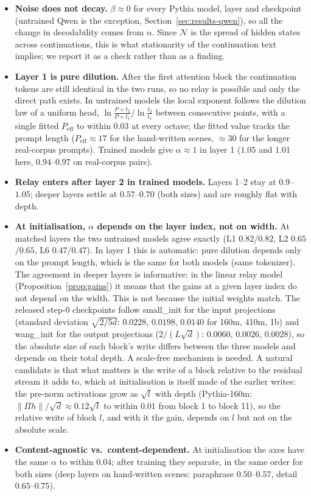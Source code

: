 \documentclass[11pt]{article}
\theoremstyle{definition}
\theoremstyle{remark}
\begin{document}
\begin{itemize}
  \item \textbf{Noise does not decay.} $\beta\approx 0$ for every Pythia model, layer and checkpoint (untrained Qwen is the exception, Section~\ref{sec:results-qwen}), so all the change in decodability comes from $\alpha$. Since $\mathcal N$ is the spread of hidden states across continuations, this is what stationarity of the continuation text implies; we report it as a check rather than as a finding.
  \item \textbf{Layer 1 is pure dilution.} After the first attention block the continuation tokens are still identical in the two runs, so no relay is possible and only the direct path exists. In untrained models the local exponent follows the dilution law of a uniform head, $\ln\frac{P+t_2}{P+t_1}\big/\ln\frac{t_2}{t_1}$ between consecutive points, with a single fitted $P_{\mathrm{eff}}$ to within $0.03$ at every octave; the fitted value tracks the prompt length ($P_{\mathrm{eff}}\approx17$ for the hand-written scenes, $\approx30$ for the longer real-corpus prompts). Trained models give $\alpha\approx1$ in layer 1 ($1.05$ and $1.01$ here, $0.94$--$0.97$ on real-corpus pairs).
  \item \textbf{Relay enters after layer 2 in trained models.} Layers 1--2 stay at $0.9$--$1.05$; deeper layers settle at $0.57$--$0.70$ (both sizes) and are roughly flat with depth.
  \item \textbf{At initialisation, $\alpha$ depends on the layer index, not on width.} At matched layers the two untrained models agree exactly (L1 $0.82$/$0.82$, L2 $0.65$/$0.65$, L6 $0.47$/$0.47$). In layer 1 this is automatic: pure dilution depends only on the prompt length, which is the same for both models (same tokenizer). The agreement in deeper layers is informative: in the linear relay model (Proposition~\ref{prop:gains}) it means that the gains at a given layer index do not depend on the width. This is not because the initial weights match. The released step-0 checkpoints follow small\_init for the input projections (standard deviation $\sqrt{2/5d}$: $0.0228$, $0.0198$, $0.0140$ for 160m, 410m, 1b) and wang\_init for the output projections ($2/(L\sqrt d)$: $0.0060$, $0.0026$, $0.0028$), so the absolute size of each block's write differs between the three models and depends on their total depth. A scale-free mechanism is needed. A natural candidate is that what matters is the write of a block relative to the residual stream it adds to, which at initialisation is itself made of the earlier writes: the pre-norm activations grow as $\sqrt l$ with depth (Pythia-160m: $\|\Pi h\|/\sqrt{d}\approx0.12\sqrt l$ to within $0.01$ from block 1 to block 11), so the relative write of block $l$, and with it the gain, depends on $l$ but not on the absolute scale.  
  \item \textbf{Content-agnostic vs.\ content-dependent.} At initialisation the axes have the same $\alpha$ to within $0.04$; after training they separate, in the same order for both sizes (deep layers on hand-written scenes: paraphrase $0.50$--$0.57$, detail $0.65$--$0.75$).
\end{itemize}
\end{document}
